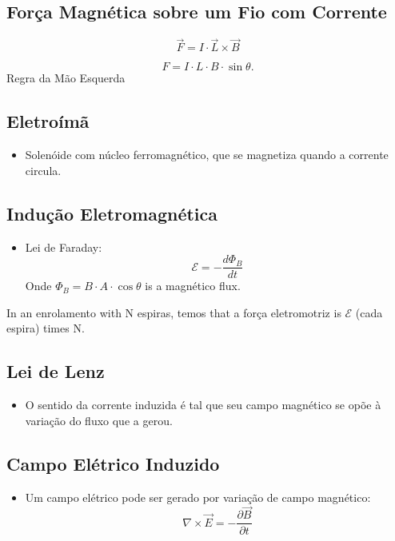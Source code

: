 \documentclass[a4paper,12pt]{article}
\begin{document}
\begin{multicols}{2}
\section{Força Magnética sobre um Fio com Corrente}

\begin{equation*}
    \vec{F} = I \cdot \vec{L} \times \vec{B}
\end{equation*}

\begin{equation*}
    F = I \cdot L \cdot B \cdot \sin\theta.
\end{equation*}
Regra da M\~ao Esquerda

\subsection{Eletroímã}
\begin{itemize}
    \item Solenóide com núcleo ferromagnético, que se magnetiza quando a corrente circula.
\end{itemize}

\subsection{Indução Eletromagnética}
\begin{itemize}
    \item Lei de Faraday:
\[         \mathcal{E} = -\frac{d\Phi_B}{dt}     \] Onde $\Phi_B = B \cdot A \cdot \cos\theta$ is a magnético flux.
\end{itemize}

In an enrolamento with N espiras, temos that a força eletromotriz is $\mathcal{E}$ (cada espira) times N. 

\subsection{Lei de Lenz}
\begin{itemize}
    \item O sentido da corrente induzida é tal que seu campo magnético se opõe à variação do fluxo que a gerou.
\end{itemize}

\subsection{Campo Elétrico Induzido}
\begin{itemize}
    \item Um campo elétrico pode ser gerado por variação de campo magnético:
    \[
        \nabla \times \vec{E} = -\frac{\partial \vec{B}}{\partial t}
    \]
\end{itemize}


\end{multicols}
\end{document}
